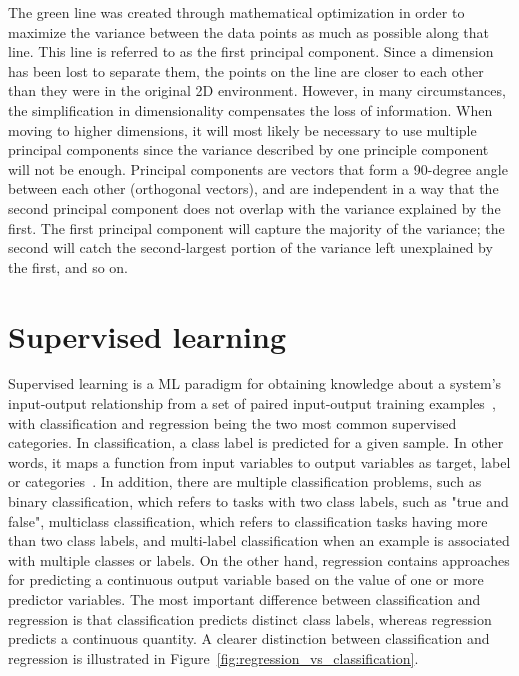 The green line was created through mathematical optimization in order to maximize the variance between the data points as much as possible along that line. This line is referred to as the first principal component. Since a dimension has been lost to separate them, the points on the line are closer to each other than they were in the original 2D environment. However, in many circumstances, the simplification in dimensionality compensates the loss of information. When moving to higher dimensions, it will most likely be necessary to use multiple principal components since the variance described by one principle component will not be enough. Principal components are vectors that form a 90-degree angle between each other (orthogonal vectors), and are independent in a way that the second principal component does not overlap with the variance explained by the first. The first principal component will capture the majority of the variance; the second will catch the second-largest portion of the variance left unexplained by the first, and so on.

\section{Supervised learning}

Supervised learning is a \gls{ML} paradigm for obtaining knowledge about a system's input-output relationship from a set of paired input-output training examples~\cite{Liu2012SupervisedLearning}, with classification and regression being the two most common supervised categories. In classification, a class label is predicted for a given sample. In other words, it maps a function from input variables to output variables as target, label or categories~\cite{Sarker2021MachineDirections}.
In addition, there are multiple classification problems, such as binary classification, which refers to tasks with two class labels, such as "true and false", multiclass classification, which refers to classification tasks having more than two class labels, and multi-label classification when an example is associated with multiple classes or labels. On the other hand, regression contains approaches for predicting a continuous output variable based on the value of one or more predictor variables. The most important difference between classification and regression is that classification predicts distinct class labels, whereas regression predicts a continuous quantity. A clearer distinction between classification and regression is illustrated in Figure~\ref{fig:regression_vs_classification}.
    
